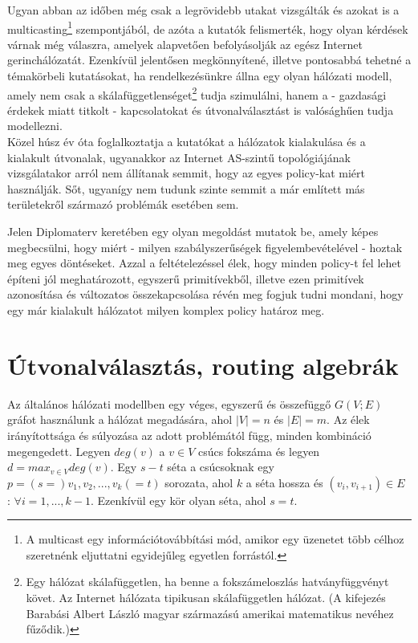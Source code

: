   Ugyan abban az időben még csak a legrövidebb utakat vizsgálták és azokat is a multicasting\footnote{A multicast egy információtovábbítási mód, amikor egy üzenetet több célhoz szeretnénk eljuttatni egyidejűleg egyetlen forrástól.} szempontjából, de azóta a kutatók felismerték, hogy olyan kérdések várnak még válaszra, amelyek alapvetően befolyásolják az egész Internet gerinchálózatát. Ezenkívül jelentősen megkönnyítené, illetve pontosabbá tehetné a témakörbeli kutatásokat, ha rendelkezésünkre állna egy olyan hálózati modell, amely nem csak a skálafüggetlenséget\footnote{Egy hálózat skálafüggetlen, ha benne a fokszámeloszlás hatványfüggvényt követ. Az Internet hálózata tipikusan skálafüggetlen hálózat. (A kifejezés Barabási Albert László magyar származású amerikai matematikus nevéhez fűződik.)} tudja szimulálni, hanem a - gazdasági érdekek miatt titkolt - kapcsolatokat és útvonalválasztást is valósághűen tudja modellezni.\\

  Közel húsz év óta foglalkoztatja a kutatókat a hálózatok kialakulása és a kialakult útvonalak, ugyanakkor az Internet AS-szintű topológiájának vizsgálatakor arról nem állítanak semmit, hogy az egyes policy-kat miért használják. Sőt, ugyanígy nem tudunk szinte semmit a már említett más területekről származó problémák esetében sem.

  Jelen Diplomaterv keretében egy olyan megoldást mutatok be, amely képes megbecsülni, hogy miért - milyen szabályszerűségek figyelembevételével - hoztak meg egyes döntéseket. Azzal a feltételezéssel élek, hogy minden policy-t fel lehet építeni jól meghatározott, egyszerű primitívekből, illetve ezen primitívek azonosítása és változatos összekapcsolása révén meg fogjuk tudni mondani, hogy egy már kialakult hálózatot milyen komplex policy határoz meg.\\

  \section{Útvonalválasztás, routing algebrák}\label{section_routingalgebrak}

  Az általános hálózati modellben egy véges, egyszerű és összefüggő $G(V;E)$ gráfot használunk a hálózat megadására, ahol $|V| = n$ és $|E| = m$. Az élek irányítottsága és súlyozása az adott problémától függ, minden kombináció megengedett. Legyen $deg(v)$ a $v \in V$ csúcs fokszáma és legyen $d = max_{v \in V} deg(v)$. Egy $s-t$ séta a csúcsoknak egy $p = (s =)v_1, v_2, ..., v_k(= t)$ sorozata, ahol $k$ a séta hossza és $(v_i, v_{i+1}) \in E$ : $\forall i = 1,...,k-1$. Ezenkívül egy kör olyan séta, ahol $s = t$.

